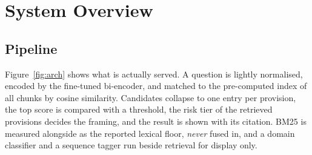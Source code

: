 \documentclass[10pt,a4paper]{article}
\begin{document}
\section{System Overview}

\subsection{Pipeline}
Figure~\ref{fig:arch} shows what is actually served. A question is lightly normalised, encoded by the fine-tuned bi-encoder, and matched to the pre-computed index of all \nChunks{} chunks by cosine similarity. Candidates collapse to one entry per provision, the top score is compared with a threshold, the risk tier of the retrieved provisions decides the framing, and the result is shown with its citation. BM25 is measured alongside as the reported lexical floor, \emph{never} fused in, and a domain classifier and a sequence tagger run beside retrieval for display only.
\end{document}
